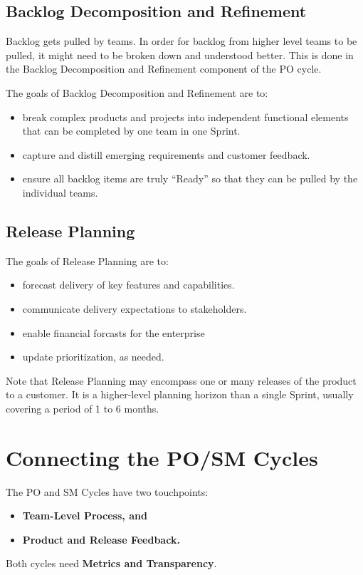 \documentclass[12pt,a4paper,parskip=full]{scrartcl}
\begin{document}
\subsection{Backlog Decomposition and Refinement}

Backlog gets pulled by teams.
In order for backlog from higher level teams to be pulled, it might need to be broken down and understood better.
This is done in the Backlog Decomposition and Refinement component of the PO cycle.

The goals of Backlog Decomposition and Refinement are to:

\begin{itemize}
	\item break complex products and projects into independent functional elements that can be completed by one team in one Sprint.
	\item capture and distill emerging requirements and customer feedback.
	\item ensure all backlog items are truly ``Ready'' so that they can be pulled by the individual teams.
\end{itemize}

\subsection{Release Planning}

The goals of Release Planning are to:

\begin{itemize}
	\item forecast delivery of key features and capabilities.
	\item communicate delivery expectations to stakeholders.
	\item enable financial forcasts for the enterprise
	\item update prioritization, as needed.
\end{itemize}

Note that Release Planning may encompass one or many releases of the product to a customer. It is a higher-level planning horizon than a single Sprint, usually covering a period of 1 to 6 months.

\section{Connecting the PO/SM Cycles}

The PO and SM Cycles have two touchpoints:
\begin{itemize}
	\item \textbf{Team-Level Process, and}
	\item \textbf{Product and Release Feedback.}
\end{itemize}
Both cycles need \textbf{Metrics and Transparency}.
\end{document}
